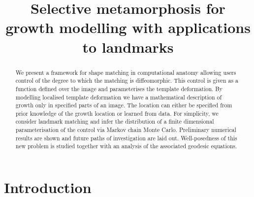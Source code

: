 \documentclass[runningheads]{llncs}
\begin{document}
%
\title{Selective metamorphosis for growth modelling with applications to landmarks}
%
%
%
%
%
\maketitle              %

\begin{abstract}
We present a framework for shape matching in computational anatomy allowing
users control of the degree to which the matching is diffeomorphic. This control
is given as a function defined over the image and parameterises the template
deformation. By modelling localised template deformation we have a mathematical
description of growth only in specified parts of an image. The location can
either be specified from prior knowledge of the growth location or learned from
data. For simplicity, we consider landmark matching and infer the distribution of
a finite dimensional parameterisation of the control via Markov chain Monte
Carlo.  Preliminary numerical results are shown and future paths of
investigation are laid out. Well-posedness of this new problem is studied
together with an analysis of the associated geodesic equations. 
\end{abstract}

\section{Introduction}
\end{document}
